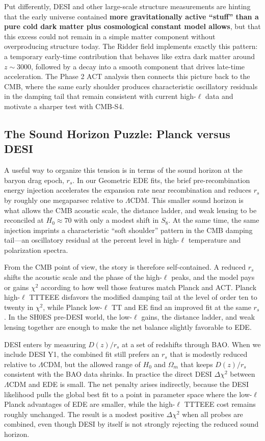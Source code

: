 \documentclass[a4paper,11pt]{article}
\begin{document}
Put differently, DESI and other large-scale structure measurements are hinting that the early universe contained \textbf{more gravitationally active ``stuff'' than a pure cold dark matter plus cosmological constant model allows}, but that this excess could not remain in a simple matter component without overproducing structure today. The Ridder field implements exactly this pattern: a temporary early-time contribution that behaves like extra dark matter around $z \sim 3000$, followed by a decay into a smooth component that drives late-time acceleration. The Phase 2 ACT analysis then connects this picture back to the CMB, where the same early shoulder produces characteristic oscillatory residuals in the damping tail that remain consistent with current high-$\ell$ data and motivate a sharper test with CMB-S4.

\subsection*{The Sound Horizon Puzzle: Planck versus DESI}

A useful way to organize this tension is in terms of the sound horizon at the baryon drag epoch, $r_s$. In our Geometric EDE fits, the brief pre-recombination energy injection accelerates the expansion rate near recombination and reduces $r_s$ by roughly one megaparsec relative to $\Lambda$CDM. This smaller sound horizon is what allows the CMB acoustic scale, the distance ladder, and weak lensing to be reconciled at $H_0 \approx 70$ with only a modest shift in $S_8$. At the same time, the same injection imprints a characteristic ``soft shoulder'' pattern in the CMB damping tail---an oscillatory residual at the percent level in high-$\ell$ temperature and polarization spectra.

From the CMB point of view, the story is therefore self-contained. A reduced $r_s$ shifts the acoustic scale and the phase of the high-$\ell$ peaks, and the model pays or gains $\chi^2$ according to how well those features match Planck and ACT. Planck high-$\ell$ TTTEEE disfavors the modified damping tail at the level of order ten to twenty in $\chi^2$, while Planck low-$\ell$ TT and EE find an improved fit at the same $r_s$. In the SH0ES pre-DESI world, the low-$\ell$ gains, the distance ladder, and weak lensing together are enough to make the net balance slightly favorable to EDE.

DESI enters by measuring $D(z)/r_s$ at a set of redshifts through BAO. When we include DESI Y1, the combined fit still prefers an $r_s$ that is modestly reduced relative to $\Lambda$CDM, but the allowed range of $H_0$ and $\Omega_m$ that keeps $D(z)/r_s$ consistent with the BAO data shrinks. In practice the direct DESI $\Delta\chi^2$ between $\Lambda$CDM and EDE is small. The net penalty arises indirectly, because the DESI likelihood pulls the global best fit to a point in parameter space where the low-$\ell$ Planck advantages of EDE are smaller, while the high-$\ell$ TTTEEE cost remains roughly unchanged. The result is a modest positive $\Delta\chi^2$ when all probes are combined, even though DESI by itself is not strongly rejecting the reduced sound horizon.
\end{document}
